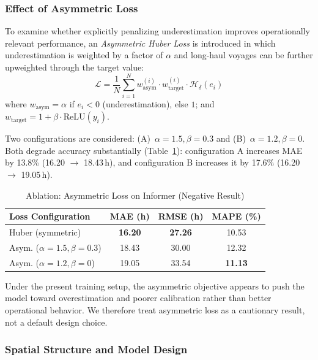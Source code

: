 \documentclass[sigconf,anonymous]{acmart}%
\begin{document}
\subsubsection{Effect of Asymmetric Loss}

To examine whether explicitly penalizing underestimation improves operationally relevant performance, an \textit{Asymmetric Huber Loss} is introduced in which underestimation is weighted by a factor of $\alpha$ and long-haul voyages can be further upweighted through the target value:
\begin{equation}
    \mathcal{L} = \frac{1}{N} \sum_{i=1}^{N} w_{\text{asym}}^{(i)} \cdot w_{\text{target}}^{(i)} \cdot \mathcal{H}_\delta(e_i)
    \label{eq:loss}
\end{equation}
where $w_{\text{asym}} = \alpha$ if $e_i < 0$ (underestimation), else $1$; and $w_{\text{target}} = 1 + \beta \cdot \text{ReLU}(y_i)$.

Two configurations are considered: (A)~$\alpha{=}1.5, \beta{=}0.3$ and (B)~$\alpha{=}1.2, \beta{=}0$. Both degrade accuracy substantially (Table~\ref{tab:ablation_loss}): configuration A increases MAE by 13.8\% (16.20 $\to$ 18.43\,h), and configuration B increases it by 17.6\% (16.20 $\to$ 19.05\,h).

\begin{table}[t]
    \centering
    \caption{Ablation: Asymmetric Loss on Informer (Negative Result)}
    \label{tab:ablation_loss}
    \begin{tabular}{lccc}
        \toprule
        \textbf{Loss Configuration} & \textbf{MAE (h)} & \textbf{RMSE (h)} & \textbf{MAPE (\%)} \\
        \midrule
        Huber (symmetric) & \textbf{16.20} & \textbf{27.26} & 10.53 \\
        Asym. ($\alpha{=}1.5, \beta{=}0.3$) & 18.43 & 30.00 & 12.32 \\
        Asym. ($\alpha{=}1.2, \beta{=}0$) & 19.05 & 33.54 & \textbf{11.13} \\
        \bottomrule
    \end{tabular}
\end{table}

Under the present training setup, the asymmetric objective appears to push the model toward overestimation and poorer calibration rather than better operational behavior. We therefore treat asymmetric loss as a cautionary result, not a default design choice.

\subsubsection{Spatial Structure and Model Design}
\end{document}
